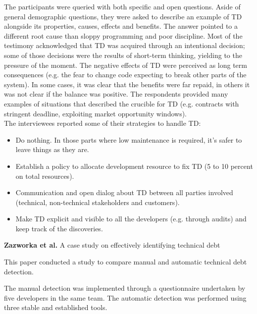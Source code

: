 The participants were queried with both specific and open questions. Aside of general demographic questions, they were asked to describe an example of TD alongside its properties, causes, effects and benefits. 
The answer pointed to a different root cause than sloppy programming and poor discipline. Most of the testimony acknowledged that TD was acquired through an intentional decision; some of those decisions were the results of short-term thinking, yielding to the pressure of the moment.
The negative effects of TD were perceived as long term consequences (e.g. the fear to change code expecting to break other parts of the system). 
In some cases, it was clear that the benefits were far repaid, in others it was not clear if the balance was positive.
The respondents provided many examples of situations that described the crucible for TD (e.g. contracts with stringent deadline, exploiting market opportunity windows). 
\\
The interviewees reported some of their strategies to handle TD:
\begin{itemize}
    \item Do nothing. In those parts where low maintenance is required, it's safer to leave things as they are.
    \item Establish a policy to allocate development resource to fix TD (5 to 10 percent on total resources).
    \item Communication and open dialog about TD between all parties involved (technical, non-technical stakeholders and customers).
    \item Make TD explicit and visible to all the developers (e.g. through audits) and keep track of the discoveries.
\end{itemize}
\textbf{Zazworka et al.} \cite{zazworka2013case} A case study on effectively identifying technical debt

This paper conducted a study to compare manual and automatic technical debt detection. 

The manual detection was implemented through a questionnaire undertaken by five developers in the same team. The automatic detection was performed using three stable and established tools. 

